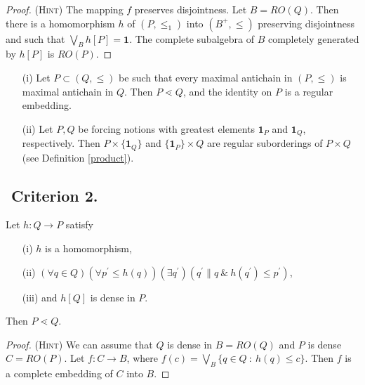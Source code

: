 \medskip

\begin{proof}
 {\scshape (Hint)} The mapping $f$ preserves disjointness. Let
$B = RO(Q)$. Then there is a homomorphism
$h$ of $(P,\leq_1)$ into $(B^+,\leq)$ preserving disjointness
and such that $\bigvee_B h[P] = \mathbf 1$. The complete subalgebra
of $B$ completely generated by $h[P]$ is $RO(P)$.
\end{proof}

\begin{example}
 \begin{itemize}
  \item[(i)] Let $P \subset (Q,\leq)$ be such that every maximal antichain
	in $(P,\leq)$ is maximal antichain in $Q$. Then $P\lessdot Q$, and
	the identity on $P$ is a regular embedding.
  \item[(ii)] Let $P,Q$ be forcing notions with greatest elements
	$\mathbf 1_P$ and $\mathbf 1_Q$, respectively. Then
	$P \times \{\mathbf 1_Q\}$ and $\{\mathbf 1_P\} \times Q$
	are regular suborderings of $P \times Q$ (see Definition \ref{product}).
 \end{itemize}
\end{example}

\subsection{${}$ \hspace{-1em}Criterion 2.}\label{criterium2}
Let $h:Q\to P$ satisfy
 \begin{itemize}
  \item[(i)] $h$ is a homomorphism,
  \item[(ii)] $(\forall q\in Q)(\forall p^\prime\leq h(q))(\exists q^\prime)(q^\prime\parallel q\ \&\ h(q^\prime)\leq p^\prime)$,
  \item[(iii)] and $h[Q]$ is dense in $P$.
 \end{itemize}
 Then $P\lessdot Q$.

\medskip

\begin{proof}
 {\scshape (Hint)} We can assume that $Q$ is dense in $B = RO(Q)$
and $P$ is dense $C = RO(P)$. Let $f:C \to B$, where
$f(c) = \bigvee_B \{q\in Q \ : \ h(q) \leq c \}$. Then $f$ is a
complete embedding of $C$ into $B$.
\end{proof}

